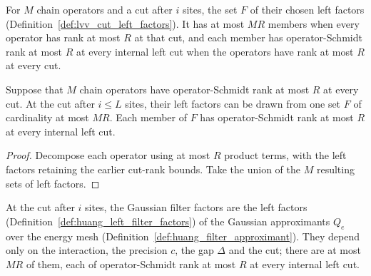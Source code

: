 \begin{definition}
    \label{def:huang_left_filter_factors}
    \leanok
    For $M$ chain operators and a cut after $i$ sites, the set $F$ of their
    chosen left factors (Definition~\ref{def:lvv_cut_left_factors}). It has
    at most $MR$ members when every operator has rank at most $R$ at that
    cut, and each member has operator-Schmidt rank at most $R$ at every
    internal left cut when the operators have rank at most $R$ at every cut.
\end{definition}

\begin{lemma}
    \label{lem:huang_finite_left_filter_factors}
    \leanok
    Suppose that $M$ chain operators have operator-Schmidt rank at most
    $R$ at every cut. At the cut after $i\le L$ sites, their left factors
    can be drawn from one set $F$ of cardinality at most $MR$. Each member
    of $F$ has operator-Schmidt rank at most $R$ at every internal left cut.
\end{lemma}
\begin{proof}
    \leanok
    Decompose each operator using at most $R$ product terms, with the left
    factors retaining the earlier cut-rank bounds. Take the union of the
    $M$ resulting sets of left factors.
\end{proof}

\begin{definition}
    \label{def:huang_gaussian_filter_factors}
    \leanok
    At the cut after $i$ sites, the Gaussian filter factors are the left
    factors (Definition~\ref{def:huang_left_filter_factors}) of the Gaussian
    approximants $Q_e$ over the energy mesh
    (Definition~\ref{def:huang_filter_approximant}). They depend only on the
    interaction, the precision $c$, the gap $\Delta$ and the cut; there are at
    most $MR$ of them, each of operator-Schmidt rank at most $R$ at every
    internal left cut.
\end{definition}

